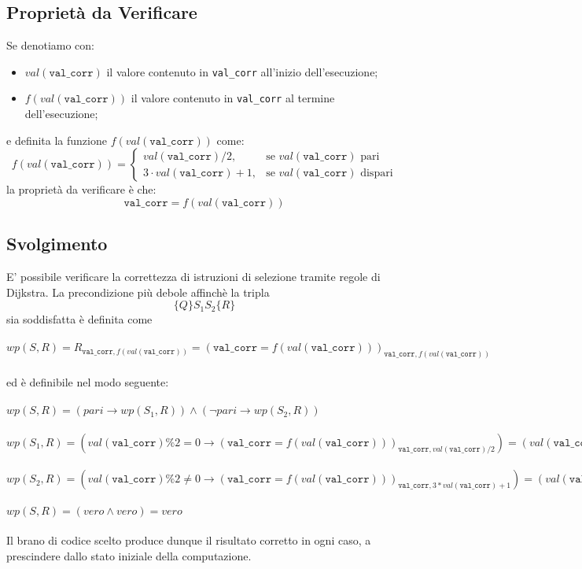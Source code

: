 \documentclass[10pt]{report}
\begin{document}
\subsection{Proprietà da Verificare}
Se denotiamo con:
\begin{itemize}
    \item $val(\texttt{val\_corr})$ il valore contenuto in \texttt{val\_corr} all'inizio dell'esecuzione;
    \item $f(val(\texttt{val\_corr}))$ il valore contenuto in \texttt{val\_corr} al termine dell'esecuzione;
\end{itemize} 
e definita la funzione $f(val(\texttt{val\_corr}))$ come:
$$
f(val(\texttt{val\_corr}))=\begin{cases} val(\texttt{val\_corr})/2, & \mbox{se }val(\texttt{val\_corr})\mbox{ pari} \\ 3 \cdot  val(\texttt{val\_corr})+1, & \mbox{se }val(\texttt{val\_corr})\mbox{ dispari}\end{cases}
$$
la proprietà da verificare è che:
$$
\texttt{val\_corr} = f(val(\texttt{val\_corr}))
$$

\subsection{Svolgimento}
E' possibile verificare la correttezza di istruzioni di selezione tramite regole di Dijkstra.
La precondizione più debole affinchè la tripla
$$
\{Q\}S_1S_2\{R\}
$$
sia soddisfatta è definita come
\\
\\
$
wp(S, R) = R_{\texttt{val\_corr}, f(val(\texttt{val\_corr}))} = (\texttt{val\_corr} = f(val(\texttt{val\_corr})))_{\texttt{val\_corr}, f(val(\texttt{val\_corr}))}$
\\
\\
ed è definibile nel modo seguente:
\\
\\
$wp(S,R) = (pari \rightarrow wp(S_1, R)) \land (\neg pari \rightarrow wp(S_2, R))$\\
\\
$wp(S_1,R) = (val(\texttt{val\_corr}) \% 2 = 0 \rightarrow (\texttt{val\_corr} = f(val(\texttt{val\_corr})))_{\texttt{val\_corr},  val(\texttt{val\_corr})/2}) = 
(val(\texttt{val\_corr}) \% 2 = 0 \rightarrow val(\texttt{val\_corr})/2 = f(val(\texttt{val\_corr}))) = vero$ 
\\
\\
$wp(S_2,R) = (val(\texttt{val\_corr}) \% 2 \ne 0 \rightarrow (\texttt{val\_corr} = f(val(\texttt{val\_corr})))_{\texttt{val\_corr},  3 * val(\texttt{val\_corr}) + 1}) = 
(val(\texttt{val\_corr}) \% 2 \ne 0 \rightarrow 3 * val(\texttt{val\_corr}) + 1 = f(val(\texttt{val\_corr}))) = vero$
\\
\\
$wp(S,R) = (vero \land vero) = vero$
\\
\\
Il brano di codice scelto produce dunque il risultato corretto in ogni caso, a prescindere dallo stato iniziale della computazione.
\end{document}
